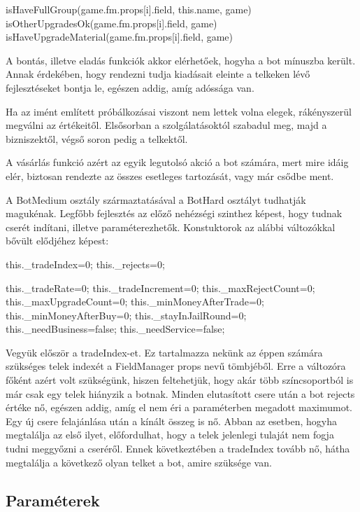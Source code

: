 \begin{javascript}
isHaveFullGroup(game.fm.props[i].field, this.name, game)
isOtherUpgradesOk(game.fm.props[i].field, game)
isHaveUpgradeMaterial(game.fm.props[i].field, game)
\end{javascript}

A bontás, illetve eladás funkciók akkor elérhetőek, hogyha a bot mínuszba került.  Annak érdekében, hogy rendezni tudja kiadásait eleinte a telkeken lévő fejlesztéseket bontja le, egészen addig, amíg adóssága van.

	Ha az imént említett próbálkozásai viszont nem lettek volna elegek, rákényszerül megválni az értékeitől. Elsősorban a szolgálatásoktól szabadul meg, majd a bizniszektől, végső soron pedig a telkektől.

	A vásárlás funkció azért az egyik legutolsó akció a bot számára, mert mire idáig elér, biztosan rendezte az összes esetleges tartozását, vagy már csődbe ment.


A BotMedium osztály származtatásával a BotHard osztályt tudhatják magukénak. Legfőbb fejlesztés az előző nehézségi szinthez képest, hogy tudnak cserét indítani, illetve paraméterezhetők. Konstuktorok az alábbi változókkal bővült elődjéhez képest:

\begin{javascript}
  this._tradeIndex=0;
  this._rejects=0;
 
  this._tradeRate=0;
  this._tradeIncrement=0;
  this._maxRejectCount=0;
  this._maxUpgradeCount=0;
  this._minMoneyAfterTrade=0;
  this._minMoneyAfterBuy=0;
  this._stayInJailRound=0;
  this._needBusiness=false;
  this._needService=false;
\end{javascript}

Vegyük először a tradeIndex-et. Ez tartalmazza nekünk az éppen számára szükséges telek indexét a FieldManager props nevű tömbjéből. Erre a változóra főként azért volt szükségünk, hiszen feltehetjük, hogy akár több színcsoportból is már csak egy telek hiányzik a botnak. Minden elutasított csere után a bot rejects értéke nő, egészen addig, amíg el nem éri a paraméterben megadott maximumot. Egy új csere felajánlása után a kínált összeg is nő. Abban az esetben, hogyha megtalálja az első ilyet, előfordulhat, hogy a telek jelenlegi tulaját nem fogja tudni meggyőzni a cseréről. Ennek következtében a tradeIndex tovább nő, hátha megtalálja a következő olyan telket a bot, amire szüksége van.

\subsection{Paraméterek}

